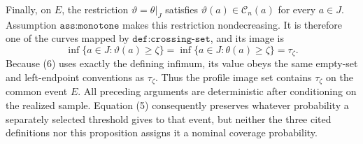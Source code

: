 Finally, on \(E\), the restriction \(\vartheta=\theta|_J\) satisfies \(\vartheta(a)\in\mathcal C_n(a)\) for every \(a\in J\).  Assumption \(\texttt{ass:monotone}\) makes this restriction nondecreasing.  It is therefore one of the curves mapped by \(\texttt{def:crossing-set}\), and its image is
\[
 \inf\{a\in J:\vartheta(a)\ge\zeta\}
 =\inf\{a\in J:\theta(a)\ge\zeta\}
 =\tau_\zeta.                                                 \tag{6}
\]
Because (6) uses exactly the defining infimum, its value obeys the same empty-set and left-endpoint conventions as \(\tau_\zeta\).  Thus the profile image set contains \(\tau_\zeta\) on the common event \(E\).  All preceding arguments are deterministic after conditioning on the realized sample.  Equation (5) consequently preserves whatever probability a separately selected threshold gives to that event, but neither the three cited definitions nor this proposition assigns it a nominal coverage probability.
